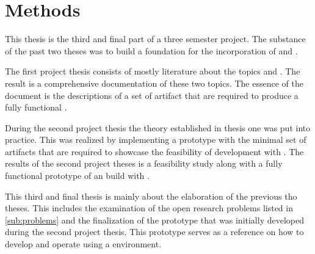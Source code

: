 \chapter{Methods}

This thesis is the third and final part of a three semester project. The
substance of the past two theses was to build a foundation for the incorporation
of \mss{} and \ogs{}. 

The first project thesis consists of mostly literature about the topics \ogs{}
and \mss{}. The result is a comprehensive documentation of these two topics. The
essence of the document is the descriptions of a set of artifact that are
required to produce a fully functional \og{}.

During the second project thesis the theory established in thesis one was put
into practice. This was realized by implementing a prototype with the minimal
set of artifacts that are required to showcase the feasibility of \og{}
development with \mss{}. The results of the second project theses is a
feasibility study along with a fully functional prototype of an \og{} build
with \mss{}.

This third and final thesis is mainly about the elaboration of the previous tho
theses. This includes the examination of the open research problems listed in
\autoref{sub:problems} and the finalization of the prototype that was initially
developed during the second project thesis. This prototype serves as a reference
on how to develop and operate \ogs{} using a \mss{} environment.






















